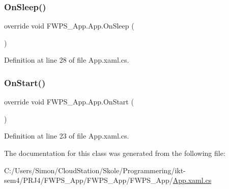 \subsubsection{\texorpdfstring{On\+Sleep()}{OnSleep()}}
{\footnotesize\ttfamily override void F\+W\+P\+S\+\_\+\+App.\+App.\+On\+Sleep (\begin{DoxyParamCaption}{ }\end{DoxyParamCaption})\hspace{0.3cm}{\ttfamily [protected]}}



Definition at line 28 of file App.\+xaml.\+cs.

\mbox{\label{class_f_w_p_s___app_1_1_app_a5f5cb73d4c0687a89db8c22bfab2b564}} 
\subsubsection{\texorpdfstring{On\+Start()}{OnStart()}}
{\footnotesize\ttfamily override void F\+W\+P\+S\+\_\+\+App.\+App.\+On\+Start (\begin{DoxyParamCaption}{ }\end{DoxyParamCaption})\hspace{0.3cm}{\ttfamily [protected]}}



Definition at line 23 of file App.\+xaml.\+cs.



The documentation for this class was generated from the following file\+:\begin{DoxyCompactItemize}
\item 
C\+:/\+Users/\+Simon/\+Cloud\+Station/\+Skole/\+Programmering/ikt-\/sem4/\+P\+R\+J4/\+F\+W\+P\+S\+\_\+\+App/\+F\+W\+P\+S\+\_\+\+App/\+F\+W\+P\+S\+\_\+\+App/\mbox{\hyperlink{_app_8xaml_8cs}{App.\+xaml.\+cs}}\end{DoxyCompactItemize}
